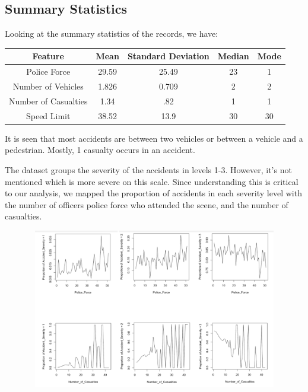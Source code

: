 \documentclass[a4paper, 10pt]{article}
\begin{document}
\subsection{Summary Statistics}
  Looking at the summary statistics of the records, we have: \\

  \begin{center}
 \begin{tabular}{|c c c c c|} 
 \hline
 Feature & Mean & Standard Deviation & Median & Mode \\ 
 \hline\hline\hline
 Police Force & 29.59 & 25.49 & 23 & 1  \\ 
 \hline
 Number of Vehicles & 1.826 & 0.709 & 2 & 2 \\
 \hline
 Number of Casualties & 1.34 & .82 & 1 & 1 \\
 \hline
 Speed Limit & 38.52 & 13.9 & 30 & 30 \\
 \hline\hline
\end{tabular}
\end{center}

  It is seen that most accidents are between two vehicles or between a vehicle and a pedestrian. Mostly, 1 casualty occurs in an accident.

    The dataset groups the severity of the accidents in levels 1-3. However, it's not mentioned which is more severe on this scale. Since understanding this is critical to our analysis, we mapped the proportion of accidents in each severity level with the number of officers police force who attended the scene, and the number of casualties. \\

   \begin{center}
     \includegraphics[width=70cm,height=7cm, scale=0.6,keepaspectratio]{severity-analysis.png}
   \end{center}
\end{document}
